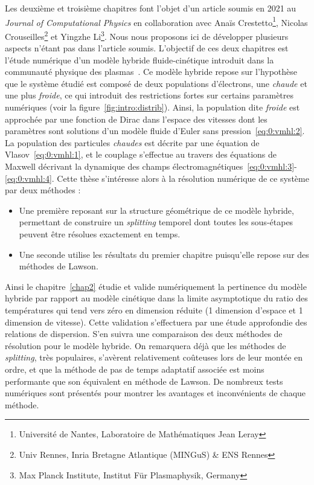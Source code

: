 Les deuxième et troisième chapitres font l'objet d'un article soumis en 2021 au \emph{Journal of Computational Physics} en collaboration avec Anaïs Crestetto\footnote{Université de Nantes, Laboratoire de Mathématiques Jean Leray}, Nicolas Crouseilles\footnote{Univ Rennes, Inria Bretagne Atlantique (MINGuS) \& ENS Rennes} et Yingzhe Li\footnote{Max Planck Institute, Institut Für Plasmaphysik, Germany}. Nous nous proposons ici de développer plusieurs aspects n'étant pas dans l'article soumis. L'objectif de ces deux chapitres est l'étude numérique d'un modèle hybride fluide-cinétique introduit dans la communauté physique des plasmas~\cite{Holderied:2020}. Ce modèle hybride repose sur l'hypothèse que le système étudié est composé de deux populations d'électrons, une \emph{chaude} et une plus \emph{froide}, ce qui introduit des restrictions fortes sur certains paramètres numériques (voir la figure~\ref{fig:intro:distrib}). Ainsi, la population dite \emph{froide} est approchée par une fonction de Dirac dans l'espace des vitesses dont les paramètres sont solutions d'un modèle fluide d'Euler sans pression~\eqref{eq:0:vmhl:2}. La population des particules \emph{chaudes} est décrite par une équation de Vlasov~\eqref{eq:0:vmhl:1}, et le couplage s'effectue au travers des équations de Maxwell décrivant la dynamique des champs électromagnétiques~\eqref{eq:0:vmhl:3}-\eqref{eq:0:vmhl:4}. Cette thèse s'intéresse alors à la résolution numérique de ce système par deux méthodes :
\begin{itemize}
  \item Une première reposant sur la structure géométrique de ce modèle hybride, permettant de construire un \emph{splitting} temporel dont toutes les sous-étapes peuvent être résolues exactement en temps.
  \item Une seconde utilise les résultats du premier chapitre puisqu'elle repose sur des méthodes de Lawson.
\end{itemize}

Ainsi le chapitre~\ref{chap2} étudie et valide numériquement la pertinence du modèle hybride par rapport au modèle cinétique dans la limite asymptotique du ratio des températures qui tend vers zéro en dimension réduite (1 dimension d'espace et 1 dimension de vitesse). Cette validation s'effectuera par une étude approfondie des relations de dispersion. S'en suivra une comparaison des deux méthodes de résolution pour le modèle hybride. On remarquera déjà que les méthodes de \emph{splitting}, très populaires, s'avèrent relativement coûteuses lors de leur montée en ordre, et que la méthode de pas de temps adaptatif associée est moins performante que son équivalent en méthode de Lawson. De nombreux tests numériques sont présentés pour montrer les avantages et inconvénients de chaque méthode.


